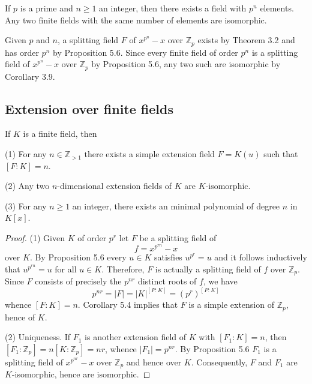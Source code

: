 \begin{corollary}
    If $p$ is a prime and $n \geq 1$ an integer, then there exists a field with $p^{n}$ elements. Any two finite fields with the same number of elements are isomorphic.

    Given $p$ and $n$, a splitting field $F$ of $x^{p^n}-x$ over $\mathbb{Z}_p$ exists by Theorem 3.2 and has order $p^n$ by Proposition 5.6. Since every finite field of order $p^n$ is a splitting field of $x^{p^n}-x$ over $\mathbb{Z}_p$ by Proposition 5.6, any two such are isomorphic by Corollary 3.9.

\end{corollary}

\subsection{Extension over finite fields}
\begin{theorem}
    If $K$ is a finite field, then

    (1) For any $n \in \mathbb{Z}_{>1}$ there exists a simple extension field $F=K(u)$ such that $[F: K]=n$.

    (2)
    Any two $n$-dimensional extension fields of $K$ are $K$-isomorphic.

    (3)
    For any $n \geq 1$ an integer, there exists an minimal polynomial of degree $n$ in $K[x]$.
    \begin{proof}
        (1)
        Given $K$ of order $p^r$ let $F$ be a splitting field of
        \begin{equation*}
            f=x^{p^{r n}}-x
        \end{equation*}
        over $K$.
        By Proposition 5.6 every $u \in K$ satisfies $u^{p^r}=u$ and it follows inductively that $u^{p^{r n}}=u$ for all $u \in K$. Therefore, $F$ is actually a splitting field of $f$ over $\mathbb{Z}_p$.
        Since $F$ consists of precisely the $p^{n r}$ distinct roots of $f$, we have
        \begin{equation*}
            p^{n r}=|F|=|K|^{[F: K]}=\left(p^r\right)^{[F: K]}
        \end{equation*}
        whence $[F: K]=n$.
        Corollary 5.4 implies that $F$ is a simple extension of $\mathbb{Z}_p$, hence of $K$.

        (2)
        Uniqueness.
        If $F_1$ is another extension field of $K$ with $\left[F_1: K\right]=n$, then $\left[F_1: \mathbb{Z}_p\right]=n\left[K: \mathbb{Z}_p\right]=n r$, whence $\left|F_1\right|=p^{n r}$. By Proposition 5.6 $F_1$ is a splitting field of $x^{p^{n r}}-x$ over $\mathbb{Z}_p$ and hence over $K$.
        Consequently, $F$ and $F_1$ are $K$-isomorphic, hence are isomorphic.
    \end{proof}
\end{theorem}
